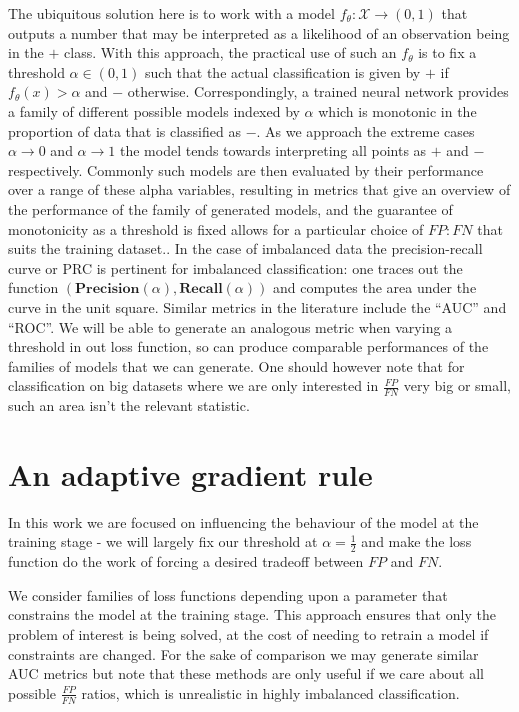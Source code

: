 \documentclass[10pt,a4paper]{article}
\begin{document}
The ubiquitous solution here is to work with a model $f_\theta:\mathcal X\rightarrow(0,1)$ that outputs a number that may be interpreted as a likelihood of an observation being in the $+$ class.
With this approach, the practical use of such an $f_\theta$ is to fix a threshold $\alpha\in(0,1)$ such that the actual classification is given by $+$ if $f_\theta(x)>\alpha$ and $-$ otherwise.
Correspondingly, a trained neural network provides a family of different possible models indexed by $\alpha$ which is monotonic in the proportion of data that is classified as $-$.
As we approach the extreme cases $\alpha\rightarrow0$ and $\alpha\rightarrow1$ the model tends towards interpreting all points as $+$ and $-$ respectively.
Commonly such models are then evaluated by their performance over a range of these alpha variables, resulting in metrics that give an overview of the performance of the family of generated models, and the guarantee of monotonicity as a threshold is fixed allows for a particular choice of $FP:FN$ that suits the training dataset..
In the case of imbalanced data the precision-recall curve or PRC is pertinent for imbalanced classification: one traces out the function $(\textbf{Precision}(\alpha),\textbf{Recall}(\alpha))$ and computes the area under the curve in the unit square.
Similar metrics in the literature include the ``AUC'' and ``ROC''.
We will be able to generate an analogous metric when varying a threshold in out loss function, so can produce comparable performances of the families of models that we can generate.
One should however note that for classification on big datasets where we are only interested in $\tfrac{FP}{FN}$ very big or small, such an area isn't the relevant statistic.
\section{An adaptive gradient rule}

In this work we are focused on influencing the behaviour of the model at the training stage - we will largely fix our threshold at $\alpha=\tfrac12$ and make the loss function do the work of forcing a desired tradeoff between $FP$ and $FN$.

We consider families of loss functions depending upon a parameter that constrains the model at the training stage.
This approach ensures that only the problem of interest is being solved, at the cost of needing to retrain a model if constraints are changed.
For the sake of comparison we may generate similar AUC metrics but note that these methods are only useful if we care about all possible $\tfrac{FP}{FN}$ ratios, which is unrealistic in highly imbalanced classification.
\end{document}
